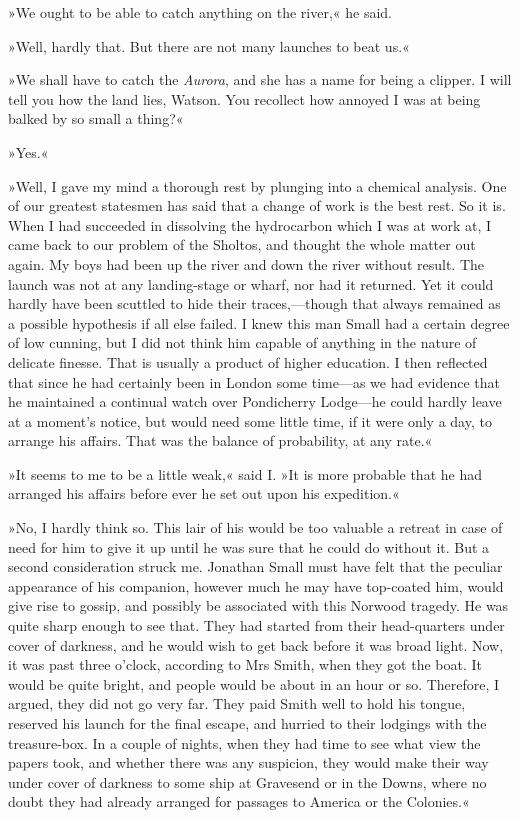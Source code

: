»We ought to be able to catch anything on the river,« he said.

»Well, hardly that. But there are not many launches to beat us.«

»We shall have to catch the \textit{Aurora}, and she has a name for being a clipper. I will tell you how the land lies, Watson. You recollect how annoyed I was at being balked by so small a thing?«

»Yes.«

»Well, I gave my mind a thorough rest by plunging into a chemical analysis. One of our greatest statesmen has said that a change of work is the best rest. So it is. When I had succeeded in dissolving the hydrocarbon which I was at work at, I came back to our problem of the Sholtos, and thought the whole matter out again. My boys had been up the river and down the river without result. The launch was not at any landing-stage or wharf, nor had it returned. Yet it could hardly have been scuttled to hide their traces,—though that always remained as a possible hypothesis if all else failed. I knew this man Small had a certain degree of low cunning, but I did not think him capable of anything in the nature of delicate finesse. That is usually a product of higher education. I then reflected that since he had certainly been in London some time—as we had evidence that he maintained a continual watch over Pondicherry Lodge—he could hardly leave at a moment's notice, but would need some little time, if it were only a day, to arrange his affairs. That was the balance of probability, at any rate.«

»It seems to me to be a little weak,« said I. »It is more probable that he had arranged his affairs before ever he set out upon his expedition.«

»No, I hardly think so. This lair of his would be too valuable a retreat in case of need for him to give it up until he was sure that he could do without it. But a second consideration struck me. Jonathan Small must have felt that the peculiar appearance of his companion, however much he may have top-coated him, would give rise to gossip, and possibly be associated with this Norwood tragedy. He was quite sharp enough to see that. They had started from their head-quarters under cover of darkness, and he would wish to get back before it was broad light. Now, it was past three o'clock, according to Mrs Smith, when they got the boat. It would be quite bright, and people would be about in an hour or so. Therefore, I argued, they did not go very far. They paid Smith well to hold his tongue, reserved his launch for the final escape, and hurried to their lodgings with the treasure-box. In a couple of nights, when they had time to see what view the papers took, and whether there was any suspicion, they would make their way under cover of darkness to some ship at Gravesend or in the Downs, where no doubt they had already arranged for passages to America or the Colonies.«

